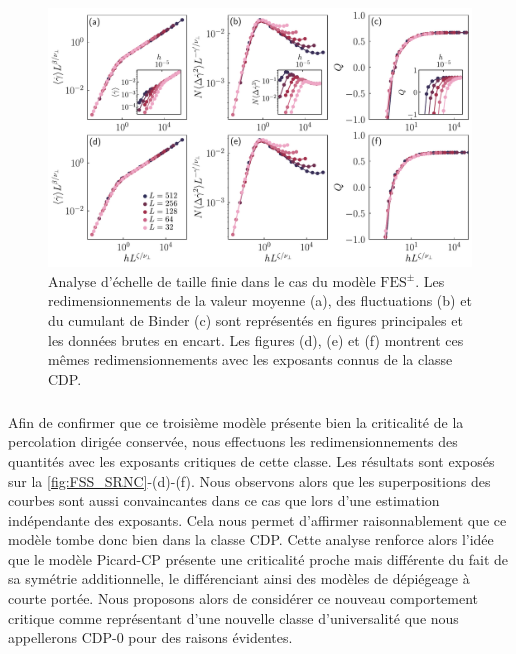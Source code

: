 \begin{figure}[h]
	\centering
	\includegraphics[width=\textwidth]{Chapitre4/Figures/CourtePortee/FSS_SRNC_edited.pdf}
	\caption{Analyse d'échelle de taille finie dans le cas du modèle $\text{FES}^\pm$. Les redimensionnements de la valeur moyenne (a), des fluctuations (b) et du cumulant de Binder (c) sont représentés en figures principales et les données brutes en encart. Les figures (d), (e) et (f) montrent ces mêmes redimensionnements avec les exposants connus de la classe CDP.}
	\label{fig:FSS_SRNC}
\end{figure}

\subparagraph{}Afin de confirmer que ce troisième modèle présente bien la criticalité de la percolation dirigée conservée, nous effectuons les redimensionnements des quantités avec les exposants critiques de cette classe. Les résultats sont exposés sur la \autoref{fig:FSS_SRNC}-(d)-(f). Nous observons alors que les superpositions des courbes sont aussi convaincantes dans ce cas que lors d'une estimation indépendante des exposants. Cela nous permet d'affirmer raisonnablement que ce modèle tombe donc bien dans la classe CDP. Cette analyse renforce alors l'idée que le modèle Picard-CP présente une criticalité proche mais différente du fait de sa symétrie additionnelle, le différenciant ainsi des modèles de dépiégeage à courte portée. Nous proposons alors de considérer ce nouveau comportement critique comme représentant d'une nouvelle classe d'universalité que nous appellerons CDP-0 pour des raisons évidentes.

